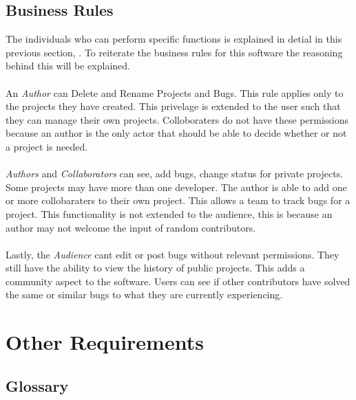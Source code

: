 \documentclass{article}
\newcommand{\comment}[1]{}
\begin{document}
\subsection{Business Rules}
\comment{
List any principles about the product, such as which individuals or roles can perform which functions under specific circumstances. These are not functional requirments in themselves, but they may imply certain functional to enforce the rules.
	}
The individuals who can perform specific functions is explained in detial in this previous section, . To reiterate the business rules for this software the reasoning behind this will be explained.
\\ \\ 
An \emph{Author} can Delete and Rename Projects and Bugs. This rule applies only to the projects they have created. This privelage is extended to the user such that they can manage their own projects. Colloboraters do not have these permissions because an author is the only actor that should be able to decide whether or not a project is needed.
\\ \\
\emph{Authors} and \emph{Collaborators} can see, add bugs, change status for private projects. Some projects may have more than one developer. The author is able to add one or more collobaraters to their own project. This allows a team to track bugs for a project. This functionality is not extended to the audience, this is because an author may not welcome the input of random contributors.
\\ \\
Lastly, the \emph{Audience} cant edit or post bugs without relevant permissions. They still have the ability to view the history of public projects. This adds a community aspect to the software. Users can see if other contributors have solved the same or similar bugs to what they are currently experiencing.
\newpage

\section{Other Requirements}
\comment{
	Define any other requirements not covered elsewhere in the \acrshort{srs}. This might include database requirements, internationalization requirments, legal requirments, reuse objectives for the projects, and so on. Add any new sections that are pertinent to the project.
	}
\subsection{Glossary}\label{glossary}
\comment{
Define all the terms necessary to properly interpret the \acrshort{srs}, including acronyms and abbreviations. You may wish to build a seperate gglossary that spans multiple projects or the entire organization, and just include terms specific to a single project in each \acrshort{srs}.
	}
\printglossary[type=\acronymtype]
\end{document}

